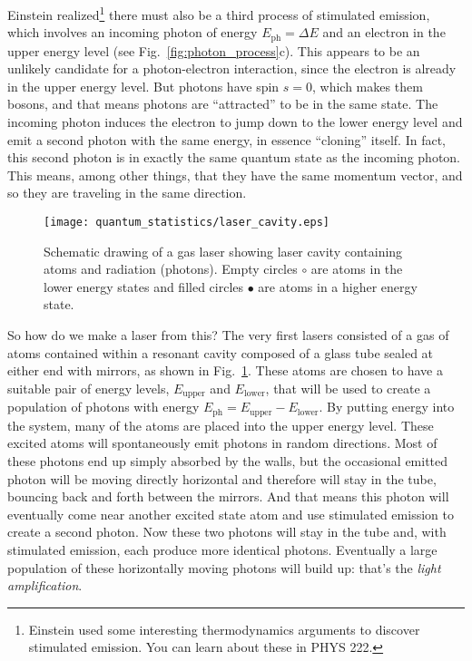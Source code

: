 Einstein realized\footnote{Einstein used some
  interesting thermodynamics arguments to discover stimulated
  emission.  You can learn about these in PHYS 222.}  there must also
be a third process of stimulated emission, which involves an incoming
photon of energy $E_\text{ph} = \Delta E$ and an electron in the upper
energy level (see Fig.~\ref{fig:photon_process}c).  This appears to be
an unlikely candidate for a photon-electron interaction, since the
electron is already in the upper energy level.  But photons have spin
$s=0$, which makes them bosons, and that means photons are
``attracted'' to be in the same state.  The incoming photon induces
the electron to jump down to the lower energy level and emit a second
photon with the same energy, in essence ``cloning'' itself.  In fact,
this second photon is in exactly the same quantum state as the
incoming photon.  This means, among other things, that they have the
same momentum vector, and so they are traveling in the same direction.


\begin{figure}[ht]
\begin{center}
\texttt{[image: quantum\_statistics/laser\_cavity.eps]}
\caption{Schematic drawing of a gas laser showing laser cavity
  containing atoms and radiation (photons). Empty circles $\circ$ are
  atoms in the lower energy states and filled circles $\bullet$ are
  atoms in a higher energy state.}
\label{fig:laser_cavity}
\end{center}
\end{figure}

So how do we make a laser from this?  The very first lasers consisted
of a gas of atoms contained within a resonant cavity composed of a
glass tube sealed at either end with mirrors, as shown in
Fig.~\ref{fig:laser_cavity}.  These atoms are chosen to have a
suitable pair of energy levels, $E_\text{upper}$ and $E_\text{lower}$,
that will be used to create a population of photons with energy
$E_\text{ph}=E_\text{upper}-E_\text{lower}$. By putting energy into
the system, many of the atoms are placed into the upper energy level.
These excited atoms will spontaneously emit photons in random
directions.  Most of these photons end up simply absorbed by the
walls, but the occasional emitted photon will be moving directly
horizontal and therefore will stay in the tube, bouncing back and
forth between the mirrors.  And that means this photon will eventually
come near another excited state atom and use stimulated emission to
create a second photon.  Now these two photons will stay in the tube
and, with stimulated emission, each produce more identical photons.
Eventually a large population of these horizontally moving photons
will build up: that's the \textit{light amplification}.


